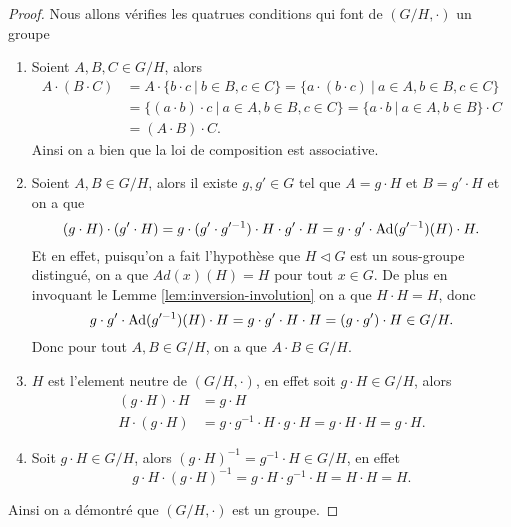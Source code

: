 \begin{proof}
	Nous allons vérifies les quatrues conditions qui font de $(G/H, \cdot)$ un groupe
	\begin{enumerate}
		\item Soient $A, B, C \in G/H$, alors
			\begin{align*}
				A \cdot (B \cdot C) &= A \cdot \{b \cdot c\ |\ b \in B, c \in C\}
					= \{a \cdot (b \cdot c)\ |\ a \in A, b \in B, c \in C\}\\
				&= \{(a \cdot b) \cdot c\ |\ a \in A, b \in B, c \in C\}
					= \{a \cdot b\ |\ a \in A, b \in B\} \cdot C\\
				&= (A \cdot B) \cdot C.
			\end{align*}
			Ainsi on a bien que la loi de composition est associative.
		\item Soient $A, B \in G/H$, alors il existe $g, g' \in G$
			tel que $A = g \cdot H$ et
			$B = g' \cdot H$ et on a que	
			\begin{equation*}
				(g \cdot H) \cdot (g' \cdot H)
				= g \cdot (g' \cdot g'^{-1}) \cdot H \cdot g' \cdot H
				= g \cdot g' \cdot \operatorname{Ad}(g'^{-1})(H) \cdot H.
			\end{equation*}
			Et en effet, puisqu'on a fait l'hypothèse que $H \triangleleft G$
			est un sous-groupe distingué,
			on a que ${Ad(x)(H) = H}$ pour tout $x \in G$.
			De plus en invoquant le Lemme \ref{lem:inversion-involution} on a
			que $H \cdot H = H$, donc
			\begin{equation*}
				g \cdot g' \cdot \operatorname{Ad}(g'^{-1})(H) \cdot H = g \cdot g' \cdot H \cdot H
				= (g \cdot g') \cdot H \in G/H.
			\end{equation*}
			Donc pour tout $A, B \in G/H$, on a que $A \cdot B \in G/H$.
		\item $H$ est l'element neutre de $(G/H, \cdot)$,
			en effet soit $g \cdot H \in G/H$, alors 
			\begin{align*}
				(g \cdot H) \cdot H &= g \cdot H\\
				H \cdot (g \cdot H) &= g \cdot g^{-1} \cdot H \cdot g \cdot H
				= g \cdot H \cdot H = g \cdot H.
			\end{align*}
		\item Soit $g \cdot H \in G/H$, alors $(g \cdot H)^{-1} = g^{-1} \cdot H \in G/H$,
			en effet
			\begin{equation*}
				g \cdot H \cdot (g \cdot H)^{-1} = g \cdot H \cdot g^{-1} \cdot H
				= H \cdot H = H.
			\end{equation*}
	\end{enumerate}
	Ainsi on a démontré que $(G/H, \cdot)$ est un groupe.
\end{proof}

